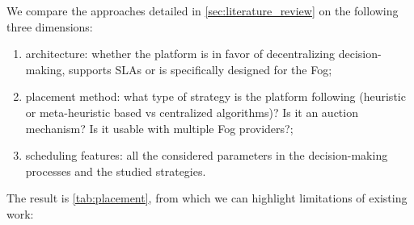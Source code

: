 \documentclass[11pt]{sdm}
\begin{document}
We compare the approaches detailed in \cref{sec:literature_review} on the following three dimensions:
\begin{enumerate}[(1)]
	\item architecture: whether the platform is in favor of decentralizing decision-making, supports \glspl{SLA} or is specifically designed for the Fog;
	\item placement method: what type of strategy is the platform following (heuristic or meta-heuristic based vs centralized algorithms)? Is it an auction mechanism? Is it usable with multiple Fog providers?;
	\item scheduling features: all the considered parameters in the decision-making processes and the studied strategies.
\end{enumerate}
The result is \cref{tab:placement}, from which we can highlight limitations of existing work:
\end{document}
